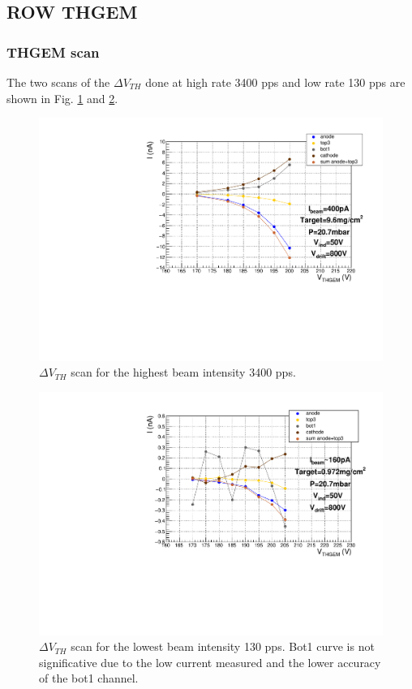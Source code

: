 \documentclass[a4paper, 11 pt]{report}
\newcommand{\Vthgem}{$\Delta V_{TH}$}
\begin{document}
  \clearpage
\subsection{ROW THGEM}
  
  \subsubsection{THGEM scan}
    The two scans of the \Vthgem{} done at high rate 3400 pps and low rate 130 pps are shown in Fig.
  \ref{fig:driftScan_ROW_withbeam_H} and   \ref{fig:driftScan_ROW_withbeam_L}.
  \begin{figure}[htbp]
	\centering
	\includegraphics[width=\textwidth]{Immagini/thgemScan_ROW_THGEM_20mbar-Ibeam400pA-2020-03-10.pdf}
	\caption{\Vthgem{} scan for the highest beam intensity 3400 pps. }
	\label{fig:driftScan_ROW_withbeam_H}
  \end{figure}
  \begin{figure}[htbp]
	\centering
	\includegraphics[width=\textwidth]{Immagini/thgemScan_ROW_THGEM_20mbar-Ibeam160pA-2020-03-10.pdf}
	\caption{\Vthgem{} scan for the lowest beam intensity 130 pps. Bot1 curve is not significative
	due to the low current measured and the lower accuracy of the bot1 channel.}
	\label{fig:driftScan_ROW_withbeam_L}
  \end{figure}
 
\end{document}
